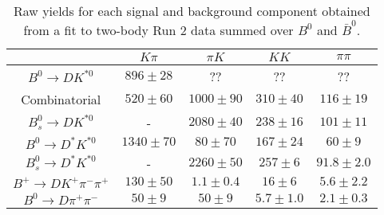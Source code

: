 \begin{table}
  \centering
  \begin{tabular}{ccccc}
      \toprule
       & $K\pi$ & $\pi K$ & $KK$ & $\pi\pi$ \\
      \midrule
      $B^0 \to DK^{*0}$ & $896 \pm 28$ & ?? & ?? & ?? \\
      Combinatorial & $520 \pm 60$ & $1000 \pm 90$ & $310 \pm 40$ & $116 \pm 19$ \\
      $B^0_s \to DK^{*0}$ & \-- & $2080 \pm 40$ & $238 \pm 16$ & $101 \pm 11$ \\
      $B^0 \to D^*K^{*0}$ & $1340 \pm 70$ & $80 \pm 70$ & $167 \pm 24$ & $60 \pm 9$ \\
      $B^0_s \to D^*K^{*0}$ & \-- & $2260 \pm 50$ & $257 \pm 6$ & $91.8 \pm 2.0$ \\
      $B^+ \to DK^+\pi^-\pi^+$ & $130 \pm 50$ & $1.1 \pm 0.4$ & $16 \pm 6$ & $5.6 \pm 2.2$ \\
      $B^0 \to D\pi^+\pi^-$ & $50 \pm 9$ & $50 \pm 9$ & $5.7 \pm 1.0$ & $2.1 \pm 0.3$ \\
      \bottomrule
      \end{tabular}
  \caption{Raw yields for each signal and background component obtained from a fit to two-body Run 2 data summed over $B^0$ and $\bar{B}^0$.}
\label{tab:yields_combined_2body_run2}
\end{table}
